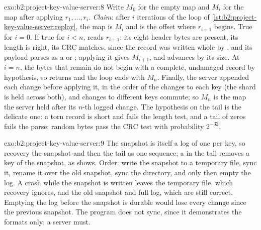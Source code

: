 \begin{solution}{exo:b2:project-key-value-server:8}
Write $M_0$ for the empty map and $M_i$ for the map after applying $r_1, \dots, r_i$. \emph{Claim}: after $i$ iterations
of the loop of \cref{lst:b2:project-key-value-server:replay}, the map is $M_i$ and  is the offset where
$r_{i+1}$ begins. True for $i = 0$. If true for $i < n$,  reads $r_{i+1}$: its eight header bytes are
present, its length is right, its CRC matches, since the record was written whole by , and its payload
parses as a  or ; applying it gives $M_{i+1}$, and  advances by its size. At $i = n$, the
bytes that remain do not begin with a complete, undamaged record by hypothesis, so  returns
 and the loop ends with $M_n$. Finally, the server appended each change before applying it, in the order of
the changes to each key (the shard  is held across both), and changes to different keys commute; so $M_n$ is the map
the server held after its $n$-th logged change. The hypothesis on the tail is the delicate one: a torn record is short
and fails the length test, and a tail of zeros fails the parse; random bytes pass the CRC test with probability $2^{-32}$.
\end{solution}

\begin{solution}{exo:b2:project-key-value-server:9}
The snapshot is itself a log of one  per key, so recovery  the snapshot and then the tail as one
sequence; a  in the tail removes a key of the snapshot, as  shows. Order: write the snapshot to a
temporary file, sync it, rename it over the old snapshot, sync the directory, and only then empty the log. A crash while
the snapshot is written leaves the temporary file, which recovery ignores, and the old snapshot and full log, which are
still correct. Emptying the log before the snapshot is durable would lose every change since the previous snapshot. The
program does not sync, since it demonstrates the formats only; a server must.
\end{solution}


